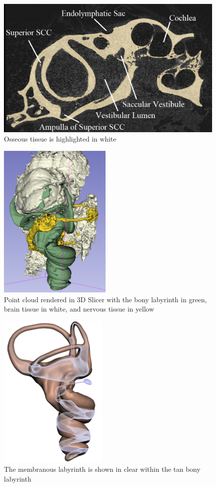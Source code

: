 \documentclass[10pt]{article}
\begin{document}
\begin{figure}[H]
	\centering
	\includegraphics[width=\linewidth]{ctsegment}
	\caption{Osseous tissue is highlighted in white}
	\label{ctsegment}
\end{figure}

\begin{figure}[H]
	\centering
	\includegraphics[height=3in]{pointcloud}
	\caption{Point cloud rendered in 3D Slicer with the bony labyrinth in green, brain tissue in white, and nervous tissue in yellow}
	\label{pc}
\end{figure}

\begin{figure}[H]
	\centering
	\includegraphics[height=3in]{translucentML}
	\caption{The membranous labyrinth is shown in clear within the tan bony labyrinth}
	\label{clearML}
\end{figure} 
\end{document}
